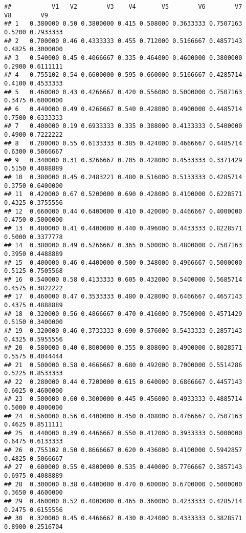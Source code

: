 \documentclass[
]{article}
\begin{document}
\begin{verbatim}
##           V1   V2        V3    V4       V5        V6        V7     V8        V9
## 1   0.380000 0.50 0.3800000 0.415 0.508000 0.3633333 0.7507163 0.5200 0.7933333
## 2   0.700000 0.46 0.4333333 0.455 0.712000 0.5166667 0.4857143 0.4825 0.3000000
## 3   0.540000 0.45 0.4066667 0.335 0.464000 0.4600000 0.3800000 0.2900 0.6111111
## 4   0.755102 0.54 0.6600000 0.595 0.660000 0.5166667 0.4285714 0.4100 0.4533333
## 5   0.460000 0.43 0.4266667 0.420 0.556000 0.5000000 0.7507163 0.3475 0.6000000
## 6   0.440000 0.49 0.4266667 0.540 0.428000 0.4900000 0.4485714 0.7500 0.6333333
## 7   0.400000 0.19 0.6933333 0.335 0.388000 0.4133333 0.5400000 0.4900 0.7222222
## 8   0.280000 0.55 0.6133333 0.385 0.424000 0.4666667 0.4485714 0.6300 0.5066667
## 9   0.340000 0.31 0.3266667 0.705 0.428000 0.4533333 0.3371429 0.5150 0.4088889
## 10  0.380000 0.45 0.2483221 0.480 0.516000 0.5133333 0.4285714 0.3750 0.6400000
## 11  0.420000 0.67 0.5200000 0.690 0.428000 0.4100000 0.6228571 0.4325 0.3755556
## 12  0.660000 0.44 0.6400000 0.410 0.420000 0.4466667 0.4000000 0.4750 0.5000000
## 13  0.480000 0.41 0.4400000 0.440 0.496000 0.4433333 0.8228571 0.5000 0.3377778
## 14  0.380000 0.49 0.5266667 0.365 0.500000 0.4800000 0.7507163 0.3950 0.4488889
## 15  0.400000 0.46 0.4400000 0.500 0.348000 0.4966667 0.5000000 0.5125 0.7505568
## 16  0.540000 0.58 0.4133333 0.605 0.432000 0.5400000 0.5685714 0.4575 0.3822222
## 17  0.460000 0.47 0.3533333 0.480 0.428000 0.6466667 0.4657143 0.4375 0.4888889
## 18  0.320000 0.56 0.4866667 0.470 0.416000 0.7500000 0.4571429 0.5150 0.3400000
## 19  0.320000 0.46 0.3733333 0.690 0.576000 0.5433333 0.2857143 0.4325 0.5955556
## 20  0.580000 0.40 0.8000000 0.355 0.808000 0.4900000 0.8028571 0.5575 0.4044444
## 21  0.500000 0.58 0.4666667 0.680 0.492000 0.7000000 0.5514286 0.5225 0.8533333
## 22  0.280000 0.44 0.7200000 0.615 0.640000 0.6866667 0.4457143 0.6025 0.4600000
## 23  0.500000 0.60 0.3000000 0.445 0.456000 0.4933333 0.4885714 0.5000 0.4000000
## 24  0.560000 0.56 0.4400000 0.450 0.408000 0.4766667 0.7507163 0.4625 0.8511111
## 25  0.440000 0.39 0.4466667 0.550 0.412000 0.3933333 0.5000000 0.6475 0.6133333
## 26  0.755102 0.50 0.8666667 0.620 0.436000 0.4100000 0.5942857 0.4825 0.5066667
## 27  0.600000 0.55 0.4800000 0.535 0.440000 0.7766667 0.3857143 0.6975 0.4088889
## 28  0.300000 0.38 0.4400000 0.470 0.600000 0.6700000 0.5000000 0.3650 0.4600000
## 29  0.460000 0.52 0.4000000 0.465 0.360000 0.4233333 0.4285714 0.2475 0.6155556
## 30  0.320000 0.45 0.4466667 0.430 0.424000 0.4333333 0.3828571 0.8900 0.2516704

\end{verbatim}
\end{document}
